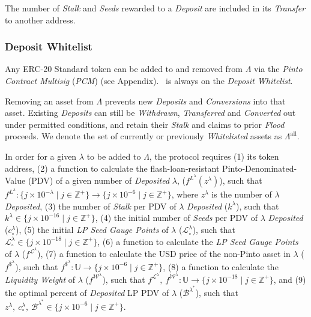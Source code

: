 \documentclass[tikz]{article}
\newcommand{\term}[1]{\textsl{#1}}
\newcommand{\Pinto}{} %
\renewcommand{\Pinto}{\usebox{\cachePinto}}
\begin{document}
\vspace*{1.2mm}

The number of \term{Stalk} and \term{Seeds} rewarded to a \term{Deposit} are included in its \term{Transfer} to another address.


\vspace*{1.2mm}
\subsubsection{Deposit Whitelist}
\vspace*{1.2mm}

Any ERC-20 Standard token can be added to and removed from $\Lambda$ via the \term{Pinto Contract Multisig} (\term{PCM}) (see Appendix). \Pinto\ is always on the \term{Deposit Whitelist}.

Removing an asset from $\Lambda$ prevents new \term{Deposits} and \term{Conversions} into that asset. Existing \term{Deposits} can still be \term{Withdrawn}, \term{Transferred} and \term{Converted} out under permitted conditions, and retain their \term{Stalk} and claims to prior \term{Flood} proceeds. We denote the set of currently or previously \term{Whitelisted} assets as $\Lambda^{\text{all}}$.

\vspace*{1.2mm}

In order for a given $\lambda$ to be added to $\Lambda$, the protocol requires 
(1) its token address, 
(2) a function to calculate the flash-loan-resistant Pinto-Denominated-Value (PDV) of a given number of \term{Deposited} $\lambda$, ($f^{L^{\lambda}}(z^{\lambda})$), such that $f^{L^{\lambda}}\colon \{j \times 10^{-\lambda} \mid j \in \mathbb{Z}^{+} \} \rightarrow \{j \times 10^{-6} \mid j \in \mathbb{Z}^{+} \}$, where $z^{\lambda}$ is the number of $\lambda$ \term{Deposited}, 
(3) the number of \term{Stalk} per PDV of $\lambda$ \term{Deposited} ($k^{\lambda}$), such that $k^{\lambda} \in \{j \times 10^{-16} \mid j \in \mathbb{Z}^{+} \}$, 
(4) the initial number of \term{Seeds} per PDV of $\lambda$ \term{Deposited} ($c_{\circ}^{\lambda}$),
(5) the initial \term{LP Seed Gauge Points} of $\lambda$ ($\mathscr{L}_{\circ}^{\lambda}$), such that $\mathscr{L}_{\circ}^{\lambda} \in \{j \times 10^{-18} \mid j \in \mathbb{Z}^{+} \}$,
(6) a function to calculate the \term{LP Seed Gauge Points} of $\lambda$ ($f^{\mathscr{L}^{\lambda}}$), 
(7) a function to calculate the USD price of the non-Pinto asset in $\lambda$ ($f^{\$^{\lambda}}$), such that $f^{\$^{\lambda}} \colon \mathbb{U} \rightarrow \{j \times 10^{-6} \mid j \in \mathbb{Z}^{+} \}$,
(8) a function to calculate the \term{Liquidity Weight} of $\lambda$ ($f^{\mathscr{W}^{\lambda}}$), such that $f^{\mathscr{L}^{\lambda}},\ f^{\mathscr{W}^{\lambda}} \colon \mathbb{U} \rightarrow \{j \times 10^{-18} \mid j \in \mathbb{Z}^{+} \}$, and
(9) the optimal percent of \term{Deposited} LP PDV of $\lambda$ ($\mathscr{B}^{\lambda^{*}}$), such that $z^{\lambda},\ c_{\circ}^{\lambda},\ \mathscr{B}^{\lambda^{*}} \in \{j \times 10^{-6} \mid j \in \mathbb{Z}^{+} \}$.
\end{document}
